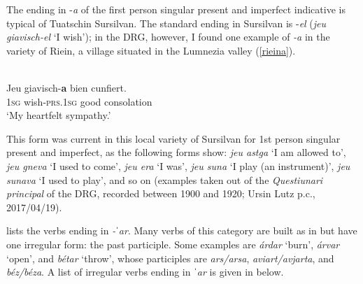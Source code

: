 The ending in -\textit{a} of the first person singular present and imperfect indicative is typical of Tuatschin Sursilvan. The standard ending in Sursilvan is -\textit{el} (\textit{jeu giavisch-el} `I wish'); in the DRG, however, I found one example of \textit{-a} in the variety of Riein, a village situated in the Lumnezia valley (\ref{rieina}).

\ea\label{rieina}
\\
\gll  Jeu giavisch-\textbf{a} bien cunfiert.  \\
     \textsc{1sg} wish-\textsc{prs.1sg} good consolation\\
\glt `My heartfelt sympathy.'
\z

This form was current in this local variety of Sursilvan for 1st person singular present and imperfect, as the following forms show: \textit{jeu astga} `I am allowed to', \textit{jeu gneva} `I used to come', \textit{jeu era} `I was', \textit{jeu suna} `I play (an instrument)', \textit{jeu sunava} `I used to play', and so on (examples taken out of the\textit{ Questiunari principal} of the DRG, recorded between 1900 and 1920; Ursin Lutz p.c., 2017/04/19).


 lists the verbs ending in \textit{-ˈar}. Many verbs of this category are built as in  but have one irregular form: the past participle. Some examples are \textit{árdar} `burn', \textit{árvar} `open', and \textit{bétar} `throw', whose participles are \textit{ars/arsa}, \textit{aviart/avjarta}, and \textit{béz/béza}. A list of irregular verbs ending in \textit{ˈar} is given in  below.


